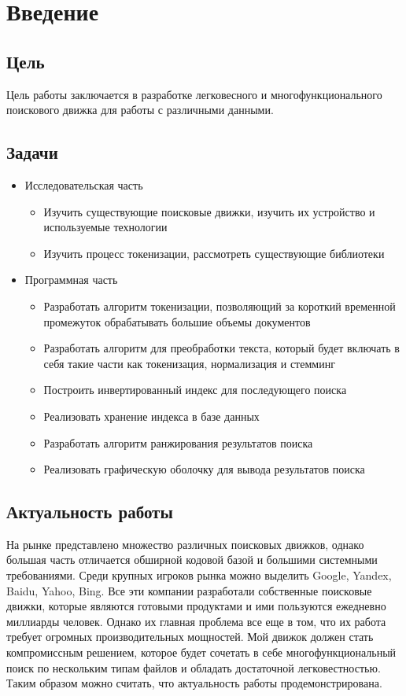 \section{Введение}
\subsection{Цель}
Цель работы заключается в разработке легковесного и многофункционального поискового движка для работы с различными данными. 

\subsection{Задачи}
\begin{itemize}
  \item{Исследовательская часть}
    \begin{itemize}
        \item {Изучить существующие поисковые движки, изучить их устройство и используемые технологии}
        \item {Изучить процесс токенизации, рассмотреть существующие библиотеки}
    \end{itemize}
  \item{Программная часть}
      \begin{itemize}
        \item{Разработать алгоритм токенизации, позволяющий за короткий временной промежуток обрабатывать большие объемы документов}
        \item {Разработать алгоритм для преобработки текста, который будет включать в себя такие части как токенизация, нормализация и стемминг}
        \item {Построить инвертированный индекс для последующего поиска}
        \item {Реализовать хранение индекса  в базе данных}
        \item {Разработать алгоритм ранжирования результатов поиска}
        \item{Реализовать графическую оболочку для вывода результатов поиска}
    \end{itemize}
\end{itemize}

\subsection{Актуальность работы}
На рынке представлено множество различных поисковых движков, однако большая часть отличается обширной кодовой базой и 
большими системными требованиями. Среди крупных игроков рынка можно выделить Google, Yandex, Baidu, Yahoo, Bing. 
Все эти компании разработали собственные поисковые движки, которые являются готовыми продуктами и ими пользуются 
ежедневно миллиарды человек. Однако их главная  проблема все еще в том, что их работа требует огромных производительных 
мощностей. Мой движок должен стать компромиссным решением, которое будет сочетать в себе многофункциональный поиск 
по нескольким типам файлов и обладать достаточной легковестностью. Таким образом можно считать, 
что актуальность работы продемонстрирована.

